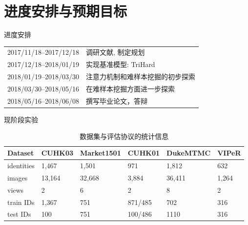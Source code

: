 \documentclass[notes]{beamer}
\begin{document}
\section{进度安排与预期目标}
\begin{frame}
	{进度安排}
\begin{table}
	\begin{tabular}{ll}
		\toprule
		2017/11/18--2017/12/18  & 调研文献, 制定规划                                        \\
		2017/12/18--2018/01/19 & 实现基准模型: TriHard \cite{hermans2017defense} \\
		2018/01/19--2018/03/30 & 注意力机制和难样本挖掘的初步探索                                                \\
		2018/03/30--2018/05/16 & 在难样本挖掘方面进一步探索                                                \\
		2018/05/16--2018/06/08 & 撰写毕业论文，答辩                              \\
		\bottomrule
	\end{tabular}
\end{table}
\end{frame}

\begin{frame}{现阶段实验}
\begin{table}
	\centering
	\caption{数据集与评估协议的统计信息}
	\label{table:dataset}
	\begin{tabular}{llllll}
		\toprule
		Dataset    & CUHK03 & Market1501 & CUHK01  & DukeMTMC & VIPeR \\
		\midrule
		identities & 1,467  & 1,501      & 971     & 1,812    & 632   \\
		images     & 13,164 & 32,668     & 3,884   & 36,411   & 1,264 \\
		views      & 2      & 6          & 2       & 8        & 2     \\
		train IDs  & 1,367  & 751        & 871/485 & 702      & 316   \\
		test IDs   & 100    & 751        & 100/486 & 1110     & 316   \\
		\bottomrule
	\end{tabular}
\end{table}
\end{frame}
\end{document}
